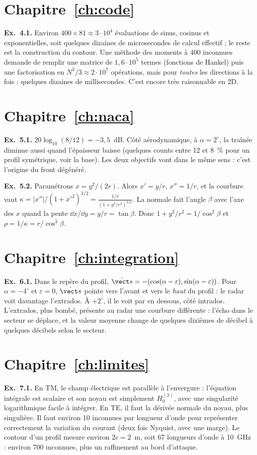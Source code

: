 \section*{Chapitre~\ref{ch:code}}
\textbf{Ex.~4.1.} Environ $400\times81\approx3\cdot10^4$ évaluations de sinus, cosinus et exponentielles, soit quelques dizaines de microsecondes de calcul effectif ; le reste est la construction du contour. Une méthode des moments à 400 inconnues demande de remplir une matrice de $1{,}6\cdot10^5$ termes (fonctions de Hankel) puis une factorisation en $N^3/3\approx2\cdot10^7$ opérations, mais pour \emph{toutes} les directions à la fois : quelques dizaines de millisecondes. C'est encore très raisonnable en 2D.

\section*{Chapitre~\ref{ch:naca}}
\textbf{Ex.~5.1.} $20\log_{10}(8/12)=-3{,}5$~dB. Côté aérodynamique, à $\alpha=2^\circ$, la traînée diminue aussi quand l'épaisseur baisse (quelques counts entre 12 et 8~\% pour un profil symétrique, voir la base). Les deux objectifs vont dans le même sens : c'est l'origine du front dégénéré.

\textbf{Ex.~5.2.} Paramétrons $x=y^2/(2r)$. Alors $x'=y/r$, $x''=1/r$, et la courbure vaut $\kappa=|x''|/(1+x'^2)^{3/2}=\frac{1/r}{(1+y^2/r^2)^{3/2}}$. La normale fait l'angle $\beta$ avec l'axe des $x$ quand la pente $\dd x/\dd y=y/r=\tan\beta$. Donc $1+y^2/r^2=1/\cos^2\beta$ et $\rho=1/\kappa=r/\cos^3\beta$.

\section*{Chapitre~\ref{ch:integration}}
\textbf{Ex.~6.1.} Dans le repère du profil, $\shat=-(\cos(\alpha-\varepsilon),\sin(\alpha-\varepsilon))$. Pour $\alpha=-4^\circ$ et $\varepsilon=0$, $\shat$ pointe vers l'avant et vers le \emph{haut} du profil : le radar voit davantage l'extrados. À $+2^\circ$, il le voit par en dessous, côté intrados. L'extrados, plus bombé, présente au radar une courbure différente : l'écho dans le secteur se déplace, et la valeur moyenne change de quelques dixièmes de décibel à quelques décibels selon le secteur.

\section*{Chapitre~\ref{ch:limites}}
\textbf{Ex.~7.1.} En TM, le champ électrique est parallèle à l'envergure : l'équation intégrale est scalaire et son noyau est simplement $H_0^{(2)}$, avec une singularité logarithmique facile à intégrer. En TE, il faut la dérivée normale du noyau, plus singulière. Il faut environ 10 inconnues par longueur d'onde pour représenter correctement la variation du courant (deux fois Nyquist, avec une marge). Le contour d'un profil mesure environ $2c=2$~m, soit 67 longueurs d'onde à 10~GHz : environ 700 inconnues, plus un raffinement au bord d'attaque.


